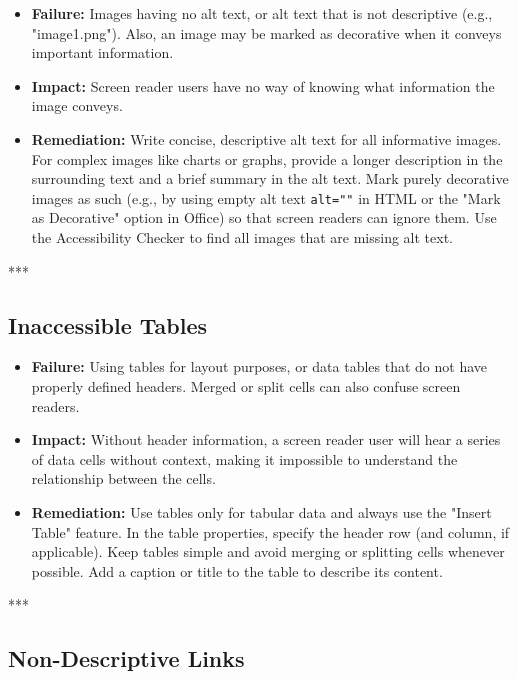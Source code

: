 \begin{itemize}
	\item \textbf{Failure:} Images having no alt text, or alt text that is not descriptive (e.g., "image1.png"). Also, an image may be marked as decorative when it conveys important information.
	\item \textbf{Impact:} Screen reader users have no way of knowing what information the image conveys.
	\item \textbf{Remediation:} Write concise, descriptive alt text for all informative images. For complex images like charts or graphs, provide a longer description in the surrounding text and a brief summary in the alt text. Mark purely decorative images as such (e.g., by using empty alt text \texttt{alt=""} in HTML or the "Mark as Decorative" option in Office) so that screen readers can ignore them. Use the Accessibility Checker to find all images that are missing alt text.
\end{itemize}

***

\subsection{Inaccessible Tables}
\label{sub:inaccessible-tables}

\begin{itemize}
	\item \textbf{Failure:} Using tables for layout purposes, or data tables that do not have properly defined headers. Merged or split cells can also confuse screen readers.
	\item \textbf{Impact:} Without header information, a screen reader user will hear a series of data cells without context, making it impossible to understand the relationship between the cells.
	\item \textbf{Remediation:} Use tables only for tabular data and always use the "Insert Table" feature. In the table properties, specify the header row (and column, if applicable). Keep tables simple and avoid merging or splitting cells whenever possible. Add a caption or title to the table to describe its content.
\end{itemize}

***

\subsection{Non-Descriptive Links}
\label{sub:non-descriptive-links}

